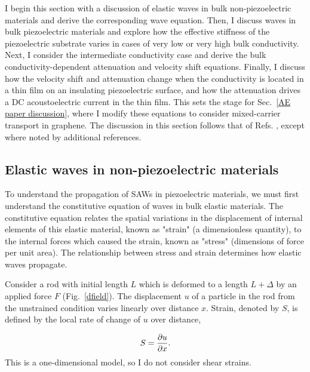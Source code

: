 \documentclass{beavtex_dub_edit}
\begin{document}
I begin this section with a discussion of elastic waves in bulk non-piezoelectric materials and derive the corresponding wave equation. Then, I discuss waves in bulk piezoelectric materials and explore how the effective stiffness of the piezoelectric substrate varies in cases of very low or very high bulk conductivity. Next, I consider the intermediate conductivity case and derive the bulk conductivity-dependent attenuation and velocity shift equations. Finally, I discuss how the velocity shift and attenuation change when the conductivity is located in a thin film on an insulating piezoelectric surface, and how the attenuation drives a DC acoustoelectric current in the thin film. This sets the stage for Sec.\ \ref{AE paper discussion}, where I modify these equations to consider mixed-carrier transport in graphene. The discussion in this section follows that of Refs. \cite{datta_surface_1986, weinreich_acoustodynamic_1956, hutson_elastic_1962, wixforth_surface_1989}, except where noted by additional references.

\subsection{Elastic waves in non-piezoelectric materials}
To understand the propagation of SAWs in piezoelectric materials, we must first understand the constitutive equation of waves in bulk elastic materials. The constitutive equation relates the spatial variations in the displacement of internal elements of this elastic material, known as "strain" (a dimensionless quantity), to the internal forces which caused the strain, known as "stress" (dimensions of force per unit area). The relationship between stress and strain determines how elastic waves propagate. 

Consider a rod with initial length $L$ which is deformed to a length $L + \Delta$ by an applied force $F$ (Fig.\ \ref{dfield}). The displacement $u$ of a particle in the rod from the unstrained condition varies linearly over distance $x$. Strain, denoted by $S$, is defined by the local rate of change of $u$ over distance, 

\begin{equation}
    S = \pdv{u}{x}. \label{strain-displacement equation}
\end{equation}
This is a one-dimensional model, so I do not consider shear strains.
\end{document}
